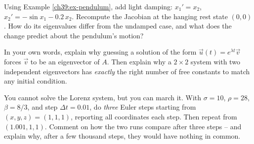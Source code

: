\begin{exercise}
Using Example \ref{ch39:ex-pendulum}, add light damping: $x_1' = x_2$, $x_2' =
-\sin x_1 - 0.2\,x_2$. Recompute the Jacobian at the hanging rest state $(0,0)$.
How do its eigenvalues differ from the undamped case, and what does the change
predict about the pendulum's motion?
\end{exercise}

\begin{exercise}
In your own words, explain why guessing a solution of the form $\vec u(t) =
e^{\lambda t}\vec v$ forces $\vec v$ to be an eigenvector of $A$. Then explain
why a $2\times2$ system with two independent eigenvectors has \emph{exactly} the
right number of free constants to match any initial condition.
\end{exercise}

\begin{exercise}
You cannot solve the Lorenz system, but you can march it. With $\sigma=10$,
$\rho=28$, $\beta=8/3$, and step $\Delta t = 0.01$, do \emph{three} Euler steps
starting from $(x,y,z) = (1,1,1)$, reporting all coordinates each step. Then
repeat from $(1.001, 1, 1)$. Comment on how the two runs compare after three
steps -- and explain why, after a few thousand steps, they would have nothing in
common.
\end{exercise}
